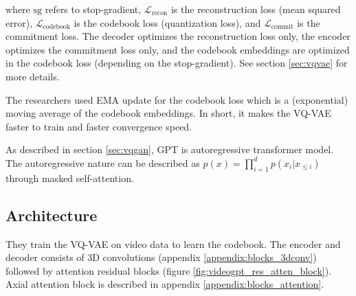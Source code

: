 where $\text{sg}$ refers to stop-gradient, $\mathcal{L}_\text{recon}$ is the reconstruction loss (mean squared error), $\mathcal{L}_\text{codebook}$ is the codebook loss (quantization loss), and $\mathcal{L}_\text{commit}$ is the commitment loss. The decoder optimizes the reconstruction loss only, the encoder optimizes the commitment loss only, and the codebook embeddings are optimized in the codebook loss (depending on the stop-gradient). See section \ref{sec:vqvae} for more details.

The researchers used EMA update \cite{vqvae} for the codebook loss which is a (exponential) moving average of the codebook embeddings. In short, it makes the VQ-VAE faster to train and faster convergence speed.

As described in section \ref{sec:vqgan}, GPT is autoregressive transformer model. The autoregressive nature can be described as $p(x) = \prod_{i=1}^{d} p(x_i | x_{\leq i})$ through masked self-attention.






\subsection{Architecture}

They train the VQ-VAE on video data to learn the codebook. The encoder and decoder consists of 3D convolutions (appendix \ref{appendix:blocks_3dconv}) followed by attention residual blocks (figure \ref{fig:videogpt_res_atten_block}). Axial attention block is described in appendix \ref{appendix:blocks_attention}.